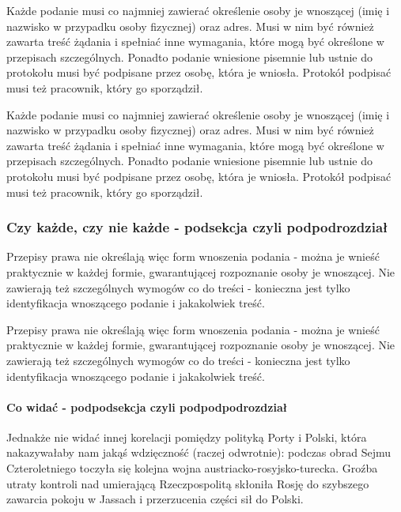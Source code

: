 Każde podanie musi co najmniej zawierać określenie osoby je wnoszącej
(imię i nazwisko w przypadku osoby fizycznej) oraz adres. Musi w nim być
również zawarta treść żądania i spełniać inne wymagania, które mogą być
określone w przepisach szczególnych. Ponadto podanie wniesione pisemnie
lub ustnie do protokołu musi być podpisane przez osobę, która je
wniosła. Protokół podpisać musi też pracownik, który go sporządził.

Każde podanie musi co najmniej zawierać określenie osoby je wnoszącej
(imię i nazwisko w przypadku osoby fizycznej) oraz adres. Musi w nim być
również zawarta treść żądania i spełniać inne wymagania, które mogą być
określone w przepisach szczególnych. Ponadto podanie wniesione pisemnie
lub ustnie do protokołu musi być podpisane przez osobę, która je
wniosła. Protokół podpisać musi też pracownik, który go sporządził.

\hypertarget{czy-kaux17cde-czy-nie-kaux17cde---podsekcja-czyli-podpodrozdziaux142}{%
\subsubsection{Czy każde, czy nie każde - podsekcja czyli
podpodrozdział}\label{czy-kaux17cde-czy-nie-kaux17cde---podsekcja-czyli-podpodrozdziaux142}}

Przepisy prawa nie określają więc form wnoszenia podania - można je
wnieść praktycznie w każdej formie, gwarantującej rozpoznanie osoby je
wnoszącej. Nie zawierają też szczególnych wymogów co do treści -
konieczna jest tylko identyfikacja wnoszącego podanie i jakakolwiek
treść.

Przepisy prawa nie określają więc form wnoszenia podania - można je
wnieść praktycznie w każdej formie, gwarantującej rozpoznanie osoby je
wnoszącej. Nie zawierają też szczególnych wymogów co do treści -
konieczna jest tylko identyfikacja wnoszącego podanie i jakakolwiek
treść.

\hypertarget{co-widaux107---podpodsekcja-czyli-podpodpodrozdziaux142}{%
\paragraph{Co widać - podpodsekcja czyli
podpodpodrozdział}\label{co-widaux107---podpodsekcja-czyli-podpodpodrozdziaux142}}

Jednakże nie widać innej korelacji pomiędzy polityką Porty i Polski,
która nakazywałaby nam jakąś wdzięczność (raczej odwrotnie): podczas
obrad Sejmu Czteroletniego toczyła się kolejna wojna
austriacko-rosyjsko-turecka. Groźba utraty kontroli nad umierającą
Rzeczpospolitą skłoniła Rosję do szybszego zawarcia pokoju w Jassach i
przerzucenia części sił do Polski.

